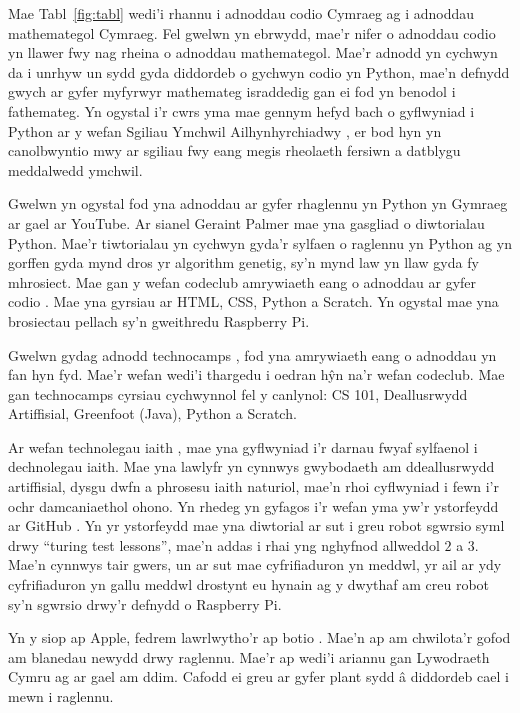 Mae Tabl~\ref{fig:tabl} wedi'i rhannu i adnoddau codio Cymraeg ag i adnoddau mathemategol Cymraeg. Fel gwelwn yn ebrwydd, mae'r nifer o adnoddau codio yn llawer fwy nag rheina o adnoddau mathemategol. Mae'r adnodd \cite{Cyfrifiadureg-maths} yn cychwyn da i unrhyw un sydd gyda diddordeb o gychwyn codio yn Python, mae'n defnydd gwych ar gyfer myfyrwyr mathemateg israddedig gan ei fod yn benodol i fathemateg. Yn ogystal i'r cwrs yma mae gennym hefyd bach o gyflwyniad i Python ar y wefan Sgiliau Ymchwil Ailhynhyrchiadwy \cite{python-sgiliauymchwil}, er bod hyn yn canolbwyntio mwy ar sgiliau fwy eang megis rheolaeth fersiwn a datblygu meddalwedd ymchwil.

\clearpage

Gwelwn yn ogystal fod yna adnoddau ar gyfer rhaglennu yn Python yn Gymraeg ar gael ar YouTube. Ar sianel Geraint Palmer \cite{youtube} mae yna gasgliad o diwtorialau Python. Mae'r tiwtorialau yn cychwyn gyda'r sylfaen o raglennu yn Python ag yn gorffen gyda mynd dros yr algorithm genetig, sy'n mynd law yn llaw gyda fy mhrosiect.
Mae gan y wefan codeclub amrywiaeth eang o adnoddau ar gyfer codio \cite{codeclub}. Mae yna gyrsiau ar HTML, CSS, Python a Scratch. Yn ogystal mae yna brosiectau pellach sy'n gweithredu Raspberry Pi. 

Gwelwn gydag adnodd technocamps \cite{technocamps}, fod yna amrywiaeth eang o adnoddau yn fan hyn fyd. Mae'r wefan wedi'i thargedu i oedran h\^{y}n na'r wefan codeclub. Mae gan technocamps cyrsiau cychwynnol fel y canlynol: CS 101, Deallusrwydd Artiffisial, Greenfoot (Java), Python a Scratch.

Ar wefan technolegau iaith \cite{technolegau-iaith}, mae yna gyflwyniad i'r darnau fwyaf sylfaenol i dechnolegau iaith. Mae yna lawlyfr yn cynnwys gwybodaeth am ddeallusrwydd artiffisial, dysgu dwfn a phrosesu iaith naturiol, mae'n rhoi cyflwyniad i fewn i'r ochr damcaniaethol ohono. Yn rhedeg yn gyfagos i'r wefan yma yw'r ystorfeydd ar GitHub \cite{github-technolegauiaith}. Yn yr ystorfeydd mae yna diwtorial ar sut i greu robot sgwrsio syml drwy ``turing test lessons'', mae'n addas i rhai yng nghyfnod allweddol $2$ a $3$. Mae'n cynnwys tair gwers, un ar sut mae cyfrifiaduron yn meddwl, yr ail ar ydy cyfrifiaduron yn gallu meddwl drostynt eu hynain ag y dwythaf am creu robot sy'n sgwrsio drwy'r defnydd o Raspberry Pi.

Yn y siop ap Apple, fedrem lawrlwytho'r ap botio \cite{botio}. Mae'n ap am chwilota'r gofod am blanedau newydd drwy raglennu. Mae'r ap wedi'i ariannu gan Lywodraeth Cymru ag ar gael am ddim. Cafodd ei greu ar gyfer plant sydd \^{a} diddordeb cael i mewn i raglennu.

